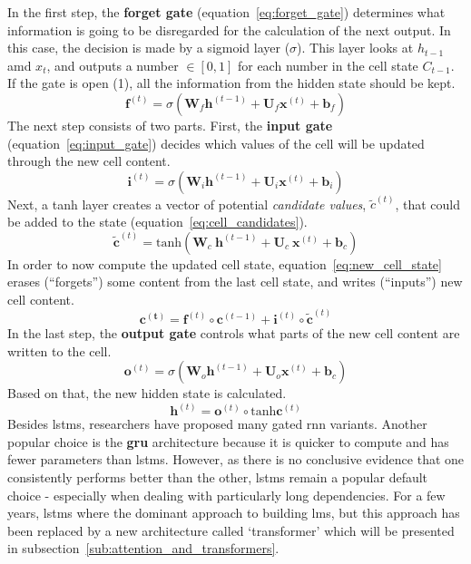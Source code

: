 In the first step, the \textbf{forget gate} (equation~\ref{eq:forget_gate}) determines what information is going to be disregarded for the calculation of the next output. In this case, the decision is made by a sigmoid layer ($ \sigma $). This layer looks at $ h_{t-1} $ amd $ x_t $, and outputs a number $ \in [0, 1] $ for each number in the cell state $ C_{t-1} $. If the gate is open (1), all the information from the hidden state should be kept.
\begin{equation}
	\label{eq:forget_gate}
	\pmb{f}^{(t)} = \sigma \left( \pmb{W}_f \pmb{h}^{(t-1)} + \pmb{U}_f \pmb{x}^{(t)} + \pmb{b}_f \right)
\end{equation}
The next step consists of two parts. First, the \textbf{input gate} (equation~\ref{eq:input_gate}) decides which values of the cell will be updated through the new cell content.
\begin{equation}
	\label{eq:input_gate}
	\pmb{i}^{(t)} = \sigma \left( \pmb{W}_i \pmb{h}^{(t-1)} + \pmb{U}_i \pmb{x}^{(t)} + \pmb{b}_i \right)
\end{equation}
Next, a tanh layer creates a vector of potential \textit{candidate values}, $ \widetilde{c}^{(t)} $, that could be added to the state (equation~\ref{eq:cell_candidates}).
\begin{equation}
	\label{eq:cell_candidates}
	\widetilde{\pmb{c}}^{(t)} = \text{tanh} \left( \pmb{W}_c \ \pmb{h}^{(t-1)} + \pmb{U}_c \ \pmb{x}^{(t)} + \pmb{b}_c \right)
\end{equation}
In order to now compute the updated cell state, equation~\ref{eq:new_cell_state} erases (``forgets'') some content from the last cell state, and writes (``inputs'') new cell content.
\begin{equation}
	\label{eq:new_cell_state}
	\pmb{c^{(t)}} = \pmb{f}^{(t)} \circ \pmb{c}^{(t-1)} + \pmb{i}^{(t)} \circ \widetilde{\pmb{c}}^{(t)}
\end{equation}
In the last step, the \textbf{output gate} controls what parts of the new cell content are written to the cell.
\begin{equation}
	\pmb{o}^{(t)} = \sigma \left( \pmb{W}_o \pmb{h}^{(t-1)} + \pmb{U}_o \pmb{x}^{(t)} + \pmb{b}_c \right)
\end{equation}
Based on that, the new hidden state is calculated.
\begin{equation}
	\pmb{h}^{(t)} = \pmb{o}^{(t)} \circ \text{tanh} \pmb{c}^{(t)}
\end{equation}
Besides \gls{lstm}s, researchers have proposed many gated \gls{rnn} variants. Another popular choice is the \textbf{\gls{gru}} architecture because it is quicker to compute and has fewer parameters than \gls{lstm}s. However, as there is no conclusive evidence that one consistently performs better than the other, \gls{lstm}s remain a popular default choice - especially when dealing with particularly long dependencies. For a few years, \gls{lstm}s where the dominant approach to building \gls{lm}s, but this approach has been replaced by a new architecture called `transformer' which will be presented in subsection~\ref{sub:attention_and_transformers}.
